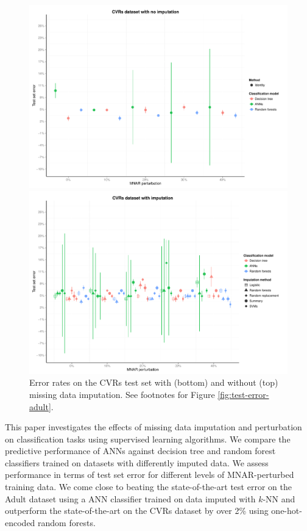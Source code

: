 \documentclass[10pt]{book}
\theoremstyle{definition}
\begin{document}
\begin{figure}[h!]
\includegraphics [scale=0.45]{figure/test-errors-votes-no-imp.pdf}\par
\includegraphics [scale=0.45]{figure/test-errors-votes-imp.pdf}\par
   \caption{\footnotesize Error rates on the CVRs test set with (bottom) and without (top) missing data imputation. See footnotes for Figure \ref{fig:test-error-adult}.}
   \label{fig:test-error-votes}
\end{figure}

\par

\setcounter{chapter}{4}
\setcounter{equation}{0} %

This paper investigates the effects of missing data imputation and perturbation on classification tasks using supervised learning algorithms. We compare the predictive performance of ANNs against decision tree and random forest classifiers trained on datasets with differently imputed data. We assess performance in terms of test set error for different levels of MNAR-perturbed training data. We come close to beating the state-of-the-art test error on the Adult dataset using a ANN classifier trained on data imputed with $k$-NN  and outperform the state-of-the-art on the CVRs dataset by over 2\% using one-hot-encoded random forests. 
\end{document}
